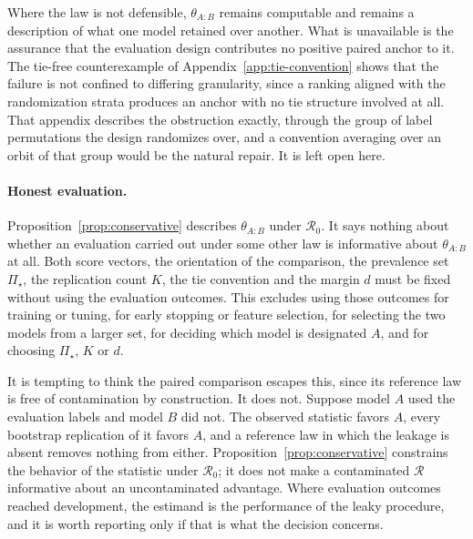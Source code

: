 \documentclass[11pt]{article}
\newcommand{\Regime}{\mathcal{R}}
\newcommand{\PSet}{\Pi_\star}
\theoremstyle{remark}
\begin{document}
Where the law is not defensible, $\theta_{A:B}$ remains computable and remains a description of what one model retained over another. What is unavailable is the assurance that the evaluation design contributes no positive paired anchor to it. The tie-free counterexample of Appendix~\ref{app:tie-convention} shows that the failure is not confined to differing granularity, since a ranking aligned with the randomization strata produces an anchor with no tie structure involved at all. That appendix describes the obstruction exactly, through the group of label permutations the design randomizes over, and a convention averaging over an orbit of that group would be the natural repair. It is left open here.

\paragraph{Honest evaluation.}
Proposition~\ref{prop:conservative} describes $\theta_{A:B}$ under $\Regime_0$. It says nothing about whether an evaluation carried out under some other law is informative about $\theta_{A:B}$ at all. Both score vectors, the orientation of the comparison, the prevalence set $\PSet$, the replication count $K$, the tie convention and the margin $d$ must be fixed without using the evaluation outcomes. This excludes using those outcomes for training or tuning, for early stopping or feature selection, for selecting the two models from a larger set, for deciding which model is designated $A$, and for choosing $\PSet$, $K$ or $d$.

It is tempting to think the paired comparison escapes this, since its reference law is free of contamination by construction. It does not. Suppose model $A$ used the evaluation labels and model $B$ did not. The observed statistic favors $A$, every bootstrap replication of it favors $A$, and a reference law in which the leakage is absent removes nothing from either. Proposition~\ref{prop:conservative} constrains the behavior of the statistic under $\Regime_0$; it does not make a contaminated $\Regime$ informative about an uncontaminated advantage. Where evaluation outcomes reached development, the estimand is the performance of the leaky procedure, and it is worth reporting only if that is what the decision concerns.
\end{document}
